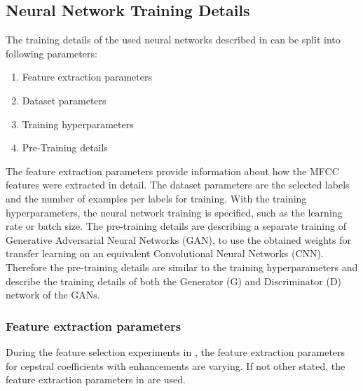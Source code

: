 
\subsection{Neural Network Training Details}\label{sec:exp_details_training}
The training details of the used neural networks described in  can be split into following parameters:
\begin{enumerate}
  \item Feature extraction parameters
  \item Dataset parameters
  \item Training hyperparameters
  \item Pre-Training details
\end{enumerate}
The feature extraction parameters provide information about how the MFCC features were extracted in detail.
The dataset parameters are the selected labels and the number of examples per labels for training.
With the training hyperparameters, the neural network training is specified, such as the learning rate or batch size.
The pre-training details are describing a separate training of Generative Adversarial Neural Networks (GAN), to use the obtained weights for transfer learning on an equivalent Convolutional Neural Networks (CNN).
Therefore the pre-training details are similar to the training hyperparameters and describe the training details of both the Generator (G) and Discriminator (D) network of the GANs.



\subsubsection{Feature extraction parameters}
During the feature selection experiments in , the feature extraction parameters for cepstral coefficients with enhancements are varying.
If not other stated, the feature extraction parameters in  are used.




